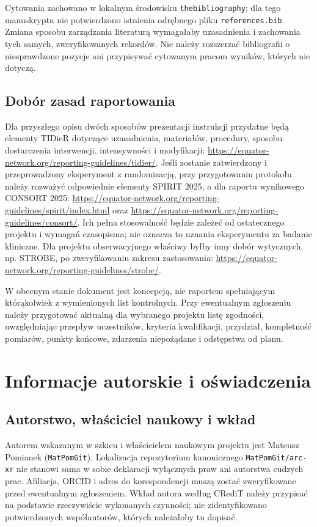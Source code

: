 \documentclass[11pt,a4paper]{article}
\begin{document}
Cytowania zachowano w lokalnym środowisku \texttt{thebibliography}; dla tego manuskryptu nie potwierdzono istnienia odrębnego pliku \texttt{references.bib}. Zmiana sposobu zarządzania literaturą wymagałaby uzasadnienia i zachowania tych samych, zweryfikowanych rekordów. Nie należy rozszerzać bibliografii o niesprawdzone pozycje ani przypisywać cytowanym pracom wyników, których nie dotyczą.

\subsection{Dobór zasad raportowania}
Dla przyszłego opisu dwóch sposobów prezentacji instrukcji przydatne będą elementy TIDieR dotyczące uzasadnienia, materiałów, procedury, sposobu dostarczenia interwencji, intensywności i modyfikacji: \url{https://equator-network.org/reporting-guidelines/tidier/}. Jeśli zostanie zatwierdzony i przeprowadzony eksperyment z randomizacją, przy przygotowaniu protokołu należy rozważyć odpowiednie elementy SPIRIT 2025, a dla raportu wynikowego CONSORT 2025: \url{https://equator-network.org/reporting-guidelines/spirit/index.html} oraz \url{https://equator-network.org/reporting-guidelines/consort/}. Ich pełna stosowalność będzie zależeć od ostatecznego projektu i wymagań czasopisma; nie oznacza to uznania eksperymentu za badanie kliniczne. Dla projektu obserwacyjnego właściwy byłby inny dobór wytycznych, np. STROBE, po zweryfikowaniu zakresu zastosowania: \url{https://equator-network.org/reporting-guidelines/strobe/}.

W obecnym stanie dokument jest koncepcją, nie raportem spełniającym którąkolwiek z wymienionych list kontrolnych. Przy ewentualnym zgłoszeniu należy przygotować aktualną dla wybranego projektu listę zgodności, uwzględniając przepływ uczestników, kryteria kwalifikacji, przydział, kompletność pomiarów, punkty końcowe, zdarzenia niepożądane i odstępstwa od planu.

\section*{Informacje autorskie i oświadczenia}
\subsection*{Autorstwo, właściciel naukowy i wkład}
Autorem wskazanym w szkicu i właścicielem naukowym projektu jest Mateusz Pomianek (\texttt{MatPomGit}). Lokalizacja repozytorium kanonicznego \texttt{MatPomGit/arc-xr} nie stanowi sama w sobie deklaracji wyłącznych praw ani autorstwa cudzych prac. Afiliacja, ORCID i adres do korespondencji muszą zostać zweryfikowane przed ewentualnym zgłoszeniem. Wkład autora według CRediT należy przypisać na podstawie rzeczywiście wykonanych czynności; nie zidentyfikowano potwierdzonych współautorów, których należałoby tu dopisać.
\end{document}
